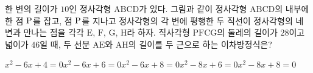 \noindent\begin{minipage}[t]{0.58\linewidth}\vspace{0pt}\raggedright 한 변의 길이가 $10$인 정사각형 $\mathrm{ABCD}$가 있다. 그림과 같이 정사각형 $\mathrm{ABCD}$의 내부에 한 점 $\mathrm{P}$를 잡고, 점 $\mathrm{P}$를 지나고 정사각형의 각 변에 평행한 두 직선이 정사각형의 네 변과 만나는 점을 각각 $\mathrm{E}$, $\mathrm{F}$, $\mathrm{G}$, $\mathrm{H}$라 하자. 직사각형 $\mathrm{PFCG}$의 둘레의 길이가 $28$이고 넓이가 $46$일 때, 두 선분 $\mathrm{AE}$와 $\mathrm{AH}$의 길이를 두 근으로 하는 이차방정식은? \end{minipage}\hfill\begin{minipage}[t]{0.4\linewidth}\vspace{0pt}\centering \resizebox{\ifdim\width>\linewidth\linewidth\else\width\fi}{!}{}\end{minipage}\par
\begin{choicesii}{$x^2-6x+4=0$}{$x^2-6x+6=0$}{$x^2-6x+8=0$}{$x^2-8x+6=0$}{$x^2-8x+8=0$}\end{choicesii}
